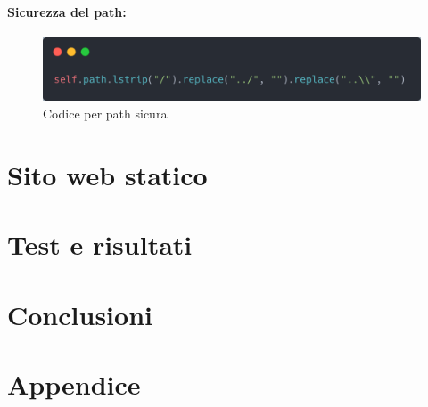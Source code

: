 \documentclass[a4paper,12pt]{report}
\begin{document}
\subsubsection{Sicurezza del path:}
\begin{figure}[H]
    \centering
    \includegraphics[width=1\textwidth]{img/safe_path.png}
    \caption{Codice per path sicura}
    \label{fig:safe_path}
\end{figure}


\chapter{Sito web statico}

\chapter{Test e risultati}

\chapter{Conclusioni}

\chapter{Appendice}
\end{document}
